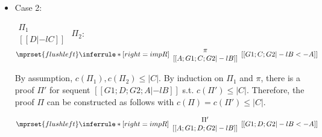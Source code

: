 \begin{itemize}
\item Case 2:
      \begin{center}
        \scriptsize
        \begin{math}
          \begin{array}{c}
            \Pi_1 \\
            {[[D |-l C]]}
          \end{array}
        \end{math}
        \qquad\qquad
        $\Pi_2$:
        \begin{math}
          $$\mprset{flushleft}
          \inferrule* [right={\tiny impR}] {
            {
              \begin{array}{c}
                \pi \\
                {[[A; G1; C; G2 |-l B]]}
              \end{array}
            }
          }{[[G1; C; G2 |-l B <- A]]}
        \end{math}
      \end{center}
      By assumption, $c(\Pi_1),c(\Pi_2)\leq |C|$. By induction on $\Pi_1$
      and $\pi$, there is a proof $\Pi'$ for sequent
      $[[G1; D; G2; A |-l B]]$ s.t. $c(\Pi') \leq |C|$. Therefore, the
      proof $\Pi$ can be constructed as follows with
      $c(\Pi) = c(\Pi') \leq |C|$.
      \begin{center}
        \scriptsize
        \begin{math}
          $$\mprset{flushleft}
          \inferrule* [right={\tiny impR}] {
            {
              \begin{array}{c}
                \Pi' \\
                {[[A; G1; D; G2 |-l B]]}
              \end{array}
            }
          }{[[G1; D; G2 |-l B <- A]]}
        \end{math}
      \end{center}
\end{itemize}



